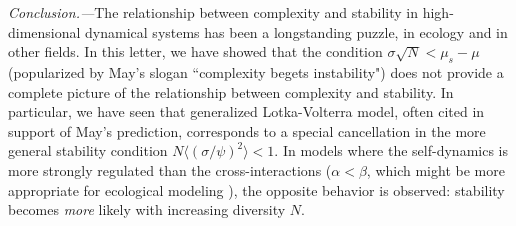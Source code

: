 \emph{Conclusion.---}The relationship between complexity and stability in high-dimensional dynamical systems has been a longstanding puzzle, in ecology and in other fields. 
In this letter, we have showed that the condition $\sigma\sqrt{N}< \mu_s - \mu$ (popularized by May's slogan ``complexity begets instability") does not provide a complete picture of the relationship between complexity and stability. 
In particular, we have seen that generalized Lotka-Volterra model, often cited in support of May's prediction, corresponds to a special cancellation in the more general stability condition $N\langle (\sigma/\psi)^2\rangle < 1$.
In models where the self-dynamics is more strongly regulated than the cross-interactions ($\alpha < \beta$, which might be more appropriate for ecological modeling \cite{Hatton2023}), the opposite behavior is observed: stability becomes \emph{more} likely with increasing diversity $N$. 